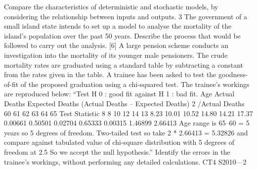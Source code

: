 \documentclass[a4paper,12pt]{article}
\begin{document}
\begin{enumerate}
Compare the characteristics of deterministic and stochastic models, by considering the
relationship between inputs and outputs.
3 The government of a small island state intends to set up a model to analyse the
mortality of the island’s population over the past 50 years.
Describe the process that would be followed to carry out the analysis.
[6]
A large pension scheme conducts an investigation into the mortality of its younger
male pensioners. The crude mortality rates are graduated using a standard table by
subtracting a constant from the rates given in the table.
A trainee has been asked to test the goodness-of-fit of the proposed graduation using
a chi-squared test. The trainee’s workings are reproduced below:
“Test H 0 : good fit against H 1 : bad fit.
Age Actual Deaths Expected Deaths (Actual Deaths –
Expected Deaths) 2
/Actual Deaths
60
61
62
63
64
65
Test Statistic 8
8
10
12
14
13 8.23
10.01
10.52
14.80
14.21
17.37 0.00661
0.50501
0.02704
0.65333
0.00315
1.46899
2.66413
Age range is 65–60 = 5 years so 5 degrees of freedom.
Two-tailed test so take 2 * 2.66413 = 5.32826 and compare against tabulated value of
chi-square distribution with 5 degrees of freedom at 2.5%
So we accept the null hypothesis.”
Identify the errors in the trainee’s workings, without performing any detailed
calculations.
CT4 S2010—2


\newpage















\end{enumerate}
\end{document}
